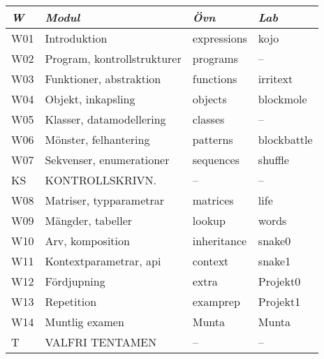 \begin{tabular}{l|l|l|l}
\textit{W} & \textit{Modul} & \textit{Övn} & \textit{Lab} \\ \hline \hline
W01 & Introduktion & expressions & kojo \\
W02 & Program, kontrollstrukturer & programs & -- \\
W03 & Funktioner, abstraktion & functions & irritext \\
W04 & Objekt, inkapsling & objects & blockmole \\
W05 & Klasser, datamodellering & classes & -- \\
W06 & Mönster, felhantering & patterns & blockbattle \\
W07 & Sekvenser, enumerationer & sequences & shuffle \\
KS & KONTROLLSKRIVN. & -- & -- \\
W08 & Matriser, typparametrar & matrices & life \\
W09 & Mängder, tabeller & lookup & words \\
W10 & Arv, komposition & inheritance & snake0 \\
W11 & Kontextparametrar, api & context & snake1 \\
W12 & Fördjupning & extra & Projekt0 \\
W13 & Repetition & examprep & Projekt1 \\
W14 & Muntlig examen & Munta & Munta \\
T & VALFRI TENTAMEN & -- & -- \\
\end{tabular}
